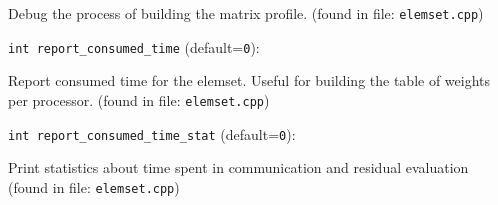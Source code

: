 Debug the process of building the matrix profile. 
 (found in file: \verb+elemset.cpp+)
\item\verb+int report_consumed_time+ {\rm(default=\verb|0|)}:

Report consumed time for the elemset. Useful for building
the table of weights per processor. 
 (found in file: \verb+elemset.cpp+)
\item\verb+int report_consumed_time_stat+ {\rm(default=\verb|0|)}:

Print statistics about time spent in communication and residual evaluation
 (found in file: \verb+elemset.cpp+)
